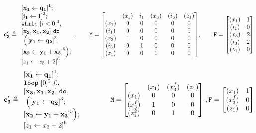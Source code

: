 \documentclass[a4paper,11pt]{article}
\begin{document}
\[
{\ssa{c_3'} \triangleq
\begin{array}{l}
     \left[\ssa{ x_1 \leftarrow q_1}  \right]^1 ; \\
     \left[\ssa{i_1} \leftarrow 1 \right]^2 ; \\
    \ewhile ~ [i < 0]^{3} ,\\
  \ssa{[x_3 , x_1 , x_2]} 
     ~ \edo
    \\
    ~ \Big( 
    \left[\ssa{ y_1 \leftarrow q_2} \right]^3; \\
    \left[\ssa{x_2 \leftarrow y_1  + x_3 } \right]^5
    \Big) ; \\
    \left[ \assign{z_1}{x_3 + 2}  \right]^{6}
\end{array},
~~~~~~
\Mtrix =  \left[ \begin{matrix}
 & (x_1) & i_1 & (x_3) & (i_3) & (z_1)  \\
(x_1) & 0 & 0 & 0 & 0 & 0 \\
(i_1) & 0 & 0 & 0 & 0 & 0 \\
(x_3) & 1 & 0 & 0 & 0 & 0 \\
(i_3) & 0 & 1 & 0 & 0 & 0 \\
(z_1) & 0 & 0 & 1 & 0 & 0 \\
\end{matrix} \right],
~~~~~~
\flag = \left [ \begin{matrix}
(x_1)  & 1 \\
(i_1)  & 0 \\
(x_3)  & 2 \\
(i_3)  & 2 \\
(z_1)  & 0 \\
\end{matrix} \right ]
}
\]
%
\[\ssa{c_3'} \triangleq
\begin{array}{l}
     \left[\ssa{ x_1 \leftarrow q_1}  \right]^1 ; \\
    \eloop ~ [0]^{2} , 0,\\
  \ssa{[x_3 , x_1 , x_2]} 
     ~ \edo
    \\
    ~ \Big( 
    \left[\ssa{ y_1 \leftarrow q_2} \right]^3; \\
    \left[\ssa{x_2 \leftarrow y_1  + x_3 } \right]^5
    \Big) ; \\
    \left[ \assign{z_1}{x_3 + 2}  \right]^{6}
\end{array}
~~~~~~~~~~~~
\Mtrix =  \left[ \begin{matrix}
 & (x_1) & (x_3^{f}) & (z_1)  \\
(x_1) & 0 & 0 & 0 \\
(x_3^{f}) & 1 & 0 & 0 \\
(z_1^{2}) & 0 & 1 & 0 \\
\end{matrix} \right] ~ , 
\flag = \left [ \begin{matrix}
(x_1) &  1 \\
(x_3^{f}) & 0 \\
(z_1) &  0 \\
\end{matrix} \right ]
\]
\end{document}
